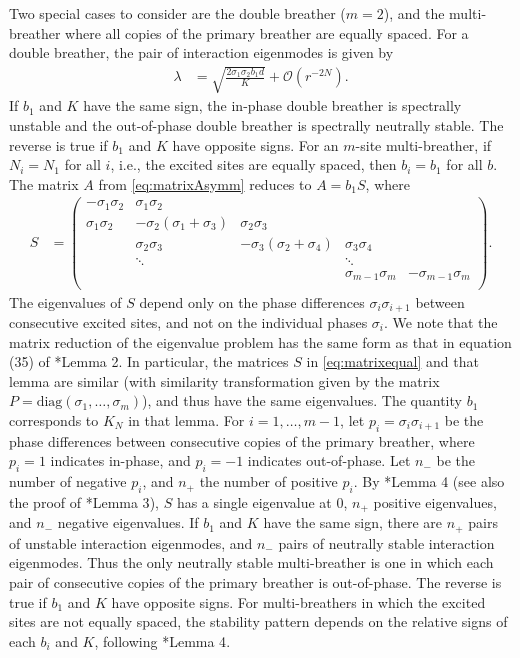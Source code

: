 \documentclass[12pt,reqno]{amsart}
\theoremstyle{definition}
\begin{document}
Two special cases to consider are the double breather ($m=2$), and the multi-breather where all copies of the primary breather are equally spaced. For a double breather, the pair of interaction eigenmodes is given by
\begin{align}\label{eq:inteigsdouble}
\lambda &= \sqrt{\frac{2 \sigma_1 \sigma_2 b_1 d}{K}} + \mathcal{O}(r^{-2N}).
\end{align}
If $b_1$ and $K$ have the same sign, the in-phase double breather is spectrally unstable and the out-of-phase double breather is spectrally neutrally stable. The reverse is true if $b_1$ and $K$ have opposite signs. For an $m$-site multi-breather, if $N_i = N_1$ for all $i$, i.e., the excited sites are equally spaced, then $b_i = b_1$ for all $b$. The matrix $A$ from \cref{eq:matrixAsymm} reduces to $A = b_1 S$, where 
\begin{align}\label{eq:matrixequal}
S &= \begin{pmatrix}
-\sigma_1 \sigma_2 & \sigma_1 \sigma_2 & & & \\
\sigma_1 \sigma_2 & -\sigma_2(\sigma_1+\sigma_3) & \sigma_2 \sigma_3 \\
& \sigma_2 \sigma_3 & -\sigma_3(\sigma_2+\sigma_4) & \sigma_3 \sigma_4 \\
& \ddots & & \ddots \\
& & & \sigma_{m-1}\sigma_m & -\sigma_{m-1}\sigma_m  \\
\end{pmatrix}.
\end{align}
The eigenvalues of $S$ depend only on the phase differences $\sigma_i \sigma_{i+1}$ between consecutive excited sites, and not on the individual phases $\sigma_i$. We note that the matrix reduction of the eigenvalue problem has the same form as that in equation (35) of \cite{Pelinovsky2012}*{Lemma 2}. In particular, the matrices $S$ in \cref{eq:matrixequal} and that lemma are similar (with similarity transformation given by the matrix $P = \text{diag}(\sigma_1, \dots, \sigma_m)$), and thus have the same eigenvalues. The quantity $b_1$ corresponds to $K_N$ in that lemma. For $i = 1, \dots, m-1$, let $p_i = \sigma_i\sigma_{i+1}$ be the phase differences between consecutive copies of the primary breather, where $p_i = 1$ indicates in-phase, and $p_i = -1$ indicates out-of-phase. Let $n_-$ be the number of negative $p_i$, and $n_+$ the number of positive $p_i$. By \cite{Sandstede1998}*{Lemma 4} (see also the proof of \cite{Pelinovsky2012}*{Lemma 3}), $S$ has a single eigenvalue at 0, $n_+$ positive eigenvalues, and $n_-$ negative eigenvalues. If $b_1$ and $K$ have the same sign, there are $n_+$ pairs of unstable interaction eigenmodes, and $n_-$ pairs of neutrally stable interaction eigenmodes. Thus the only neutrally stable multi-breather is one in which each pair of consecutive copies of the primary breather is out-of-phase. The reverse is true if $b_1$ and $K$ have opposite signs. For multi-breathers in which the excited sites are not equally spaced, the stability pattern depends on the relative signs of each $b_i$ and $K$, following \cite{Sandstede1998}*{Lemma 4}.
\end{document}
